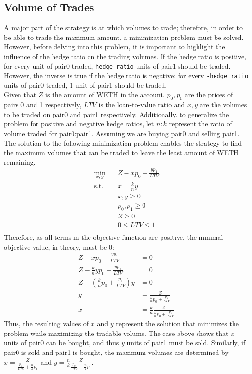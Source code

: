 \subsection{Volume of Trades}
A major part of the strategy is at which volumes to trade; therefore, in order to be able to trade the maximum amount, a minimization problem must be solved. However, before delving into this problem, it is important to highlight the influence of the hedge ratio on the trading volumes. If the hedge ratio is positive, for every unit of pair0 traded, \texttt{hedge\_ratio} units of pair1 should be traded. However, the inverse is true if the hedge ratio is negative; for every \texttt{-hedge\_ratio} units of pair0 traded, 1 unit of pair1 should be traded.
\\[3mm]
Given that $Z$ is the amount of WETH in the account, $p_0, p_1$ are the prices of pairs 0 and 1 respectively, $LTV$ is the loan-to-value ratio and $x, y$ are the volumes to be traded on pair0 and pair1 respectively. Additionally, to generalize the problem for positive and negative hedge ratios, let $n:k$ represent the ratio of volume traded for pair0:pair1. Assuming we are buying pair0 and selling pair1. The solution to the following minimization problem enables the strategy to find the maximum volumes that can be traded to leave the least amount of WETH remaining.
\begin{equation}
\begin{aligned}
\min_{x, y} \quad & Z - xp_0 - \frac{yp_1}{LTV}\\
\textrm{s.t.} \quad & x = \frac{k}{n}y\\
    &x, y \geq 0\\
    &p_0, p_1 \geq 0\\
    &Z \geq 0\\
    &0 \leq LTV \leq 1\\
\end{aligned}
\end{equation}
Therefore, as all terms in the objective function are positive, the minimal objective value, in theory, must be 0:
\begin{align*}
    Z - xp_0 - \frac{yp_1}{LTV} &= 0\\
    Z - \frac{k}{n}yp_0 - \frac{yp_1}{LTV} &= 0\\
    Z - (\frac{k}{n}p_0 + \frac{p_1}{LTV})y &= 0\\
    y &= \frac{Z}{\frac{k}{n}p_0 + \frac{p_1}{LTV}}\\
    x &= \frac{k}{n}\frac{Z}{\frac{k}{n}p_0 + \frac{p_1}{LTV}}
\end{align*}
\noindent Thus, the resulting values of $x$ and $y$ represent the solution that minimizes the problem while maximizing the tradable volume. The case above shows that $x$ units of pair0 can be bought, and thus $y$ units of pair1 must be sold. Similarly, if pair0 is sold and pair1 is bought, the maximum volumes are determined by $x = \frac{Z}{\frac{p_0}{LTV} + \frac{n}{k}p_1}$ and $y = \frac{n}{k} \frac{Z}{\frac{p_0}{LTV} + \frac{n}{k}p_1}$.


